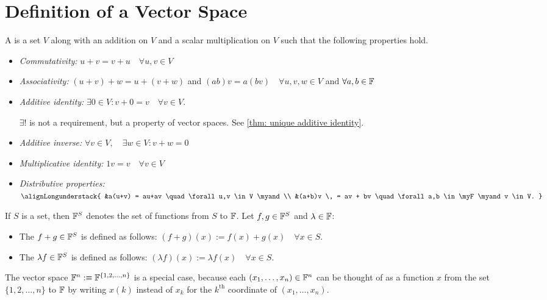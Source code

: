 \section{Definition of a Vector Space}

\setcounter{thm}{19}
\begin{mydef} 
  A  is a set $V$ along with an addition on $V$ and a scalar multiplication on $V$ such that the following properties hold.
  \begin{itemize}
    \item \emph{Commutativity:}
    $u+v = v+u \quad \forall u,v \in V$
    \item \emph{Associativity:}
    $(u+v)+w=u+(v+w)$ and $(ab)v=a(bv) \quad \forall u,v,w \in V$ and $\forall a,b \in \mathbb{F}$
    \item \emph{Additive identity:}
    $\exists 0\in V:v+0=v \quad \forall v\in V$.

    $\exists!$ is not a requirement, but a property of vector spaces. See \ref{thm: unique additive identity}.
    \item \emph{Additive inverse:}
    $\forall v\in V, \quad \exists w\in V: v+w=0$
    \item \emph{Multiplicative identity:}
    $1v = v \quad \forall v\in V$
    \item \emph{Distributive properties:}
    $
      \alignLongunderstack{
        &a(u+v) = au+av \quad \forall u,v \in V \myand  \\
        &(a+b)v \, = av + bv \quad \forall a,b \in \myF \myand v \in V.
      }
    $
  \end{itemize}
\end{mydef}

\setcounter{thm}{23}
\begin{mydef} 
  If $S$ is a set, then $\mathbb{F}^S$ denotes the set of functions from $S$ to $\mathbb{F}$. Let $f, g \in \mathbb{F}^{S}$ and $\lambda \in \mathbb{F}$:
  \begin{itemize}
    \item The  $f+g \in \mathbb{F}^{S}$ is defined as follows: $(f+g)(x) := f(x)+ g(x) \quad \forall x\in S$.
    \item The  $\lambda f \in \mathbb{F}^{S}$ is defined as follows: $(\lambda f)(x) := \lambda f(x) \quad \forall x \in S$.
  \end{itemize}
  The vector space $\mathbb{F}^{n} :\equiv \mathbb{F}^{\{1,2,\dots,n\}}$ is a special case, because each $(x_1, \dots, x_n) \in \mathbb{F}^{n}$ can be thought of as a function $x$ from the set $\{1, 2, \dots, n\}$ to $\mathbb{F}$ by writing $x(k)$ instead of $x_k$ for the $k^{\text{th}}$ coordinate of $(x_1, \dots, x_n)$.
\end{mydef}

